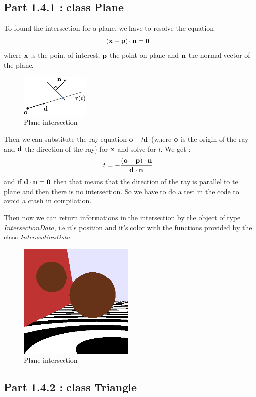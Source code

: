 \documentclass[10pt,a4paper]{report}
\begin{document}
\subsection*{Part 1.4.1 : class Plane}
To found the intersection for a plane, we have to resolve the equation $$(\bf{x}-\bf{p}) \cdot{\bf{n}} = 0$$ where $\bf{x}$ is the point of interest, $\bf p$ the point on plane and $\bf n$ the normal vector of the plane.
\begin{figure}[h!]
\caption{Plane intersection}
  \centering
    \includegraphics[width=0.3\textwidth]{planeIntersec.png}
\end{figure}
Then we can substitute the ray equation $\mathbf{o} + t\bf d$ (where $\bf o$ is the origin of the ray and $\bf d$ the direction of the ray) for $\bf x$ and solve for $t$. We get : $$ t = - {{(\bf o - \bf p) \cdot \bf n} \over {\bf d \cdot \bf n}}$$ and if ${\bf d \cdot \bf n = 0}$ then that means that the direction of the ray is parallel to te plane and then there is no intersection. So we have to do a test in the code to avoid a crash in compilation.

Then now we can return informations in the intersection by the object of type \textit{IntersectionData}, i.e it's position and it's color with the functions provided by the class \textit{IntersectionData}.
\begin{figure}[h!]
\caption{Plane intersection}
  \centering
    \includegraphics[width=0.5\textwidth]{Framework/Image1_4_1.png}
\end{figure}
\newpage
\subsection*{Part 1.4.2 : class Triangle}
\end{document}
